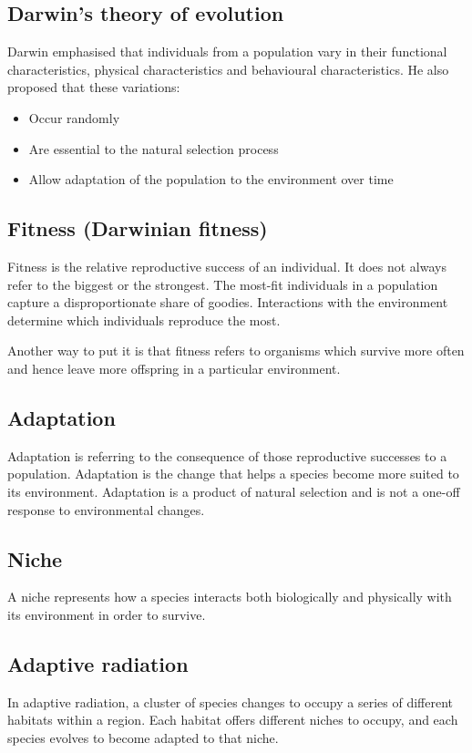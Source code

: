 \documentclass[11pt]{article}
\begin{document}
\subsection{Darwin's theory of evolution}
\label{sec:orge577c6f}
Darwin emphasised that individuals from a population vary in their functional characteristics, physical characteristics and behavioural characteristics. He also proposed that these variations:
\begin{itemize}
\item Occur randomly
\item Are essential to the natural selection process
\item Allow adaptation of the population to the environment over time
\end{itemize}
\subsection{Fitness (Darwinian fitness)}
\label{sec:org37e5018}
Fitness is the relative reproductive success of an individual. It does not always refer to the biggest or the strongest. The most-fit individuals in a population capture a disproportionate share of goodies. Interactions with the environment determine which individuals reproduce the most.


Another way to put it is that fitness refers to organisms which survive more often and hence leave more offspring in a particular environment.
\subsection{Adaptation}
\label{sec:orgb4ff268}
Adaptation is referring to the consequence of those reproductive successes to a population. Adaptation is the change that helps a species become more suited to its environment. Adaptation is a product of natural selection and is not a one-off response to environmental changes.
\subsection{Niche}
\label{sec:orgb305f9d}
A niche represents how a species interacts both biologically and physically with its environment in order to survive.
\subsection{Adaptive radiation}
\label{sec:orgbc01f49}
In adaptive radiation, a cluster of species changes to occupy a series of different habitats within a region. Each habitat offers different niches to occupy, and each species evolves to become adapted to that niche.
\end{document}
